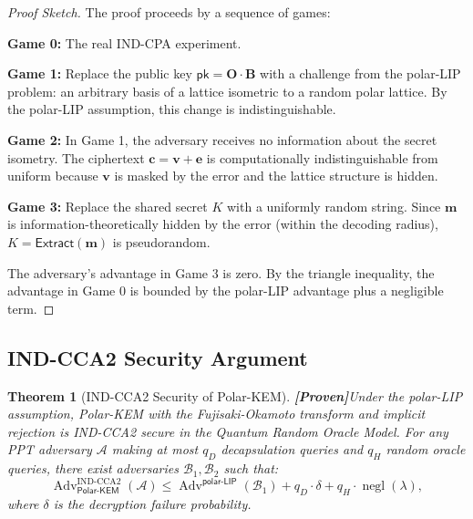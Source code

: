 \documentclass[11pt,a4paper]{article}
\newtheorem{theorem}{Theorem}[section]
\newcommand{\polarKem}{\textsf{Polar-KEM}\xspace}
\newcommand{\Extract}{\textsf{Extract}\xspace}
\newcommand{\polarLIP}{\textsf{polar-LIP}\xspace}
\newcommand{\INDCPA}{\textsf{IND-CPA}\xspace}
\newcommand{\INDCCA}{\textsf{IND-CCA2}\xspace}
\DeclareMathOperator{\negl}{negl}
\DeclareMathOperator{\Adv}{Adv}
\newcommand{\pk}{\mathsf{pk}}
\newcommand{\prv}{\textcolor{green!60!black}{\textbf{[Proven]}}}
\begin{document}
\begin{proof}[Proof Sketch]
The proof proceeds by a sequence of games:

\textbf{Game 0:} The real \INDCPA experiment.

\textbf{Game 1:} Replace the public key $\pk = \mathbf{O} \cdot \mathbf{B}$ with a challenge from the \polarLIP problem: an arbitrary basis of a lattice isometric to a random polar lattice. By the \polarLIP assumption, this change is indistinguishable.

\textbf{Game 2:} In Game 1, the adversary receives no information about the secret isometry. The ciphertext $\mathbf{c} = \mathbf{v} + \mathbf{e}$ is computationally indistinguishable from uniform because $\mathbf{v}$ is masked by the error and the lattice structure is hidden.

\textbf{Game 3:} Replace the shared secret $K$ with a uniformly random string. Since $\mathbf{m}$ is information-theoretically hidden by the error (within the decoding radius), $K = \Extract(\mathbf{m})$ is pseudorandom.

The adversary's advantage in Game 3 is zero. By the triangle inequality, the advantage in Game 0 is bounded by the \polarLIP advantage plus a negligible term.
\end{proof}

\subsection{IND-CCA2 Security Argument}\label{sec:indcca-proof}

\begin{theorem}[IND-CCA2 Security of \polarKem]\label{thm:indcca}
\prv Under the \polarLIP assumption, \polarKem with the Fujisaki-Okamoto transform and implicit rejection is \INDCCA secure in the Quantum Random Oracle Model. For any PPT adversary $\mathcal{A}$ making at most $q_D$ decapsulation queries and $q_H$ random oracle queries, there exist adversaries $\mathcal{B}_1, \mathcal{B}_2$ such that:
\[
\Adv_{\polarKem}^{\text{IND-CCA2}}(\mathcal{A}) \leq \Adv^{\polarLIP}(\mathcal{B}_1) + q_D \cdot \delta + q_H \cdot \negl(\lambda),
\]
where $\delta$ is the decryption failure probability.
\end{theorem}
\end{document}
